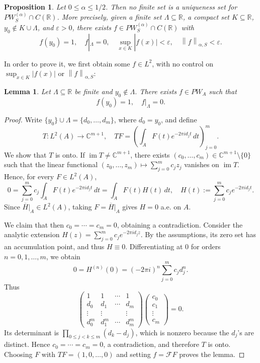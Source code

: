 \documentclass[reqno,a4paper,12pt]{amsart}
\numberwithin{equation}{section}
\newtheorem{lemma}[definition]{Lemma}
\newtheorem{proposition}[definition]{Proposition}
\def\R{{\mathbb R}}
\def\C{{\mathbb C}}
\newcommand\1{\mathds{1}}
\newcommand{\ft}{{\mathcal{F}}}
\newcommand{\norm}[1]{\left\lVert #1 \right\rVert}
\begin{document}
\begin{proposition}
\label{prop:sobolev-peak}
Let \(0\leq\alpha\leq1/2\). Then no finite set is a uniqueness set for
\(PW^{(\alpha)}_S\cap C(\R)\). More precisely, given a finite set
\(\Lambda\subseteq\R\), a compact set \(K\subseteq\R\),
\(y_0\notin K\cup\Lambda\), and \(\varepsilon>0\), there exists
\(f\in PW^{(\alpha)}_S\cap C(\R)\) with
\[
    f(y_0)=1,
    \quad f|_\Lambda=0,
    \quad \sup_{x\in K}|f(x)|<\varepsilon,
    \quad \norm{f}_{\alpha,S}<\varepsilon.
\]
\end{proposition}

In order to prove it, we first obtain some \(f\in L^2\), with no control on \(\sup_{x\in K}|f(x)|\) or \(\norm{f}_{\alpha,S}\):

\begin{lemma}\label{lem:sobolev-moment}
Let \(\Lambda\subseteq\R\) be finite and \(y_0\notin\Lambda\). There exists
\(f\in PW_A\) such that
\[
    f(y_0)=1,
    \quad f|_\Lambda=0.
\]
\end{lemma}

\begin{proof}
Write \(\{y_0\}\cup\Lambda=\{d_0,\ldots,d_m\}\), where \(d_0=y_0\), and define
\[
    T:L^2(A)\longrightarrow\C^{m+1},
    \quad
    TF=\left(\int_AF(t)e^{-2\pi i d_jt}\,dt\right)_{j=0}^m.
\]
We show that \(T\) is onto. If \(\operatorname{im} T\neq\C^{m+1}\), there
exists \((c_0,\ldots,c_m)\in\C^{m+1}\setminus\{0\}\) such that the linear
functional \((z_0,\ldots,z_m)\mapsto\sum_{j=0}^m c_jz_j\) vanishes on
\(\operatorname{im} T\). Hence, for every \(F\in L^2(A)\),
\[
    0=\sum_{j=0}^m c_j\int_AF(t)e^{-2\pi i d_jt}\,dt
     =\int_AF(t)H(t)\,dt,
    \quad H(t):=\sum_{j=0}^m c_je^{-2\pi i d_jt}.
\]
Since \(\overline H|_A\in L^2(A)\), taking \(F=\overline H|_A\) gives
\(H=0\) a.e. on \(A\).

We claim that then \(c_0=\cdots=c_m=0\), obtaining a contradiction. Consider
the analytic extension \(H(z)=\sum_{j=0}^m c_j e^{-2\pi i d_jz}\).
By the
assumptions, its zero set has an accumulation point, and thus \(H\equiv0\).
Differentiating at \(0\) for orders \(n=0,1,\ldots,m\), we obtain
\[
    0=H^{(n)}(0)=(-2\pi i)^n\sum_{j=0}^m c_jd_j^n.
\]
Thus
\[
    \begin{pmatrix}
        1&1&\cdots&1\\
        d_0&d_1&\cdots&d_m\\
        \vdots&\vdots&&\vdots\\
        d_0^m&d_1^m&\cdots&d_m^m
    \end{pmatrix}
    \begin{pmatrix}c_0\\c_1\\\vdots\\c_m\end{pmatrix}=0.
\]
Its determinant is \(\prod_{0\leq j<k\leq m}(d_k-d_j)\), which is
nonzero because the \(d_j\)'s are distinct. Hence
\(c_0=\cdots=c_m=0\), a contradiction, and therefore \(T\) is onto.
Choosing \(F\) with \(TF=(1,0,\ldots,0)\) and setting \(f=\ft F\) proves
the lemma.
\end{proof}
\end{document}
